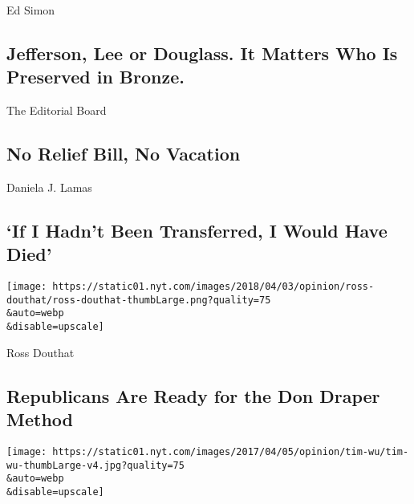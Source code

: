 \href{/2020/08/04/opinion/us-monuments-rome-unknown-god.html}{}

Ed Simon

\hypertarget{jefferson-lee-or-douglass-it-matters-who-is-preserved-in-bronze}{%
\subsection{Jefferson, Lee or Douglass. It Matters Who Is Preserved in
Bronze.}\label{jefferson-lee-or-douglass-it-matters-who-is-preserved-in-bronze}}

\href{/2020/08/04/opinion/coronavirus-relief-bill-senate-recess.html}{}

The Editorial Board

\hypertarget{no-relief-bill-no-vacation}{%
\subsection{No Relief Bill, No
Vacation}\label{no-relief-bill-no-vacation}}

\href{/2020/08/04/opinion/covid-rural-hospitals.html}{}

Daniela J. Lamas

\hypertarget{if-i-hadnt-been-transferred-i-would-have-died}{%
\subsection{`If I Hadn't Been Transferred, I Would Have
Died'}\label{if-i-hadnt-been-transferred-i-would-have-died}}

\href{/2020/08/04/opinion/trump-republicans-tea-party.html}{}

\texttt{[image: https://static01.nyt.com/images/2018/04/03/opinion/ross-douthat/ross-douthat-thumbLarge.png?quality=75\\\&auto=webp\\\&disable=upscale]}

Ross Douthat

\hypertarget{republicans-are-ready-for-the-don-draper-method}{%
\subsection{Republicans Are Ready for the Don Draper
Method}\label{republicans-are-ready-for-the-don-draper-method}}

\href{/2020/08/04/opinion/amazon-facebook-congressional-hearings.html}{}

\texttt{[image: https://static01.nyt.com/images/2017/04/05/opinion/tim-wu/tim-wu-thumbLarge-v4.jpg?quality=75\\\&auto=webp\\\&disable=upscale]}

